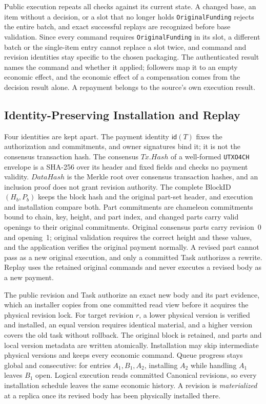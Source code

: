 Public execution repeats all checks against its current state. A changed base, an item without a decision, or a slot that no longer holds \texttt{OriginalFunding} rejects the entire batch, and exact successful replays are recognized before base validation. Since every command requires \texttt{OriginalFunding} in its slot, a different batch or the single-item entry cannot replace a slot twice, and command and revision identities stay specific to the chosen packaging. The authenticated result names the command and whether it applied; followers map it to an empty economic effect, and the economic effect of a compensation comes from the decision result alone. A repayment belongs to the source's own execution result.

\subsection{Identity-Preserving Installation and Replay}
\label{sec:protocol-installation}

Four identities are kept apart. The payment identity $\mathsf{id}(T)$ fixes the authorization and commitments, and owner signatures bind it; it is not the consensus transaction hash. The consensus $\mathit{Tx.Hash}$ of a well-formed \texttt{UTXO4CH} envelope is a SHA-256 over its header and fixed fields and checks no payment validity. $\mathit{DataHash}$ is the Merkle root over consensus transaction hashes, and an inclusion proof does not grant revision authority. The complete BlockID $(H_b,P_b)$ keeps the block hash and the original part-set header, and execution and installation compare both. Part commitments are chameleon commitments bound to chain, key, height, and part index, and changed parts carry valid openings to their original commitments. Original consensus parts carry revision~0 and opening~1; original validation requires the correct height and these values, and the application verifies the original payment normally. A revised part cannot pass as a new original execution, and only a committed Task authorizes a rewrite. Replay uses the retained original commands and never executes a revised body as a new payment.

The public revision and Task authorize an exact new body and its part evidence, which an installer copies from one committed read view before it acquires the physical revision lock. For target revision $r$, a lower physical version is verified and installed, an equal version requires identical material, and a higher version covers the old task without rollback. The original block is retained, and parts and local version metadata are written atomically. Installation may skip intermediate physical versions and keeps every economic command. Queue progress stays global and consecutive: for entries $A_1,B_1,A_2$, installing $A_2$ while handling $A_1$ leaves $B_1$ open. Logical execution reads committed Canonical revisions, so every installation schedule leaves the same economic history. A revision is \emph{materialized} at a replica once its revised body has been physically installed there.

